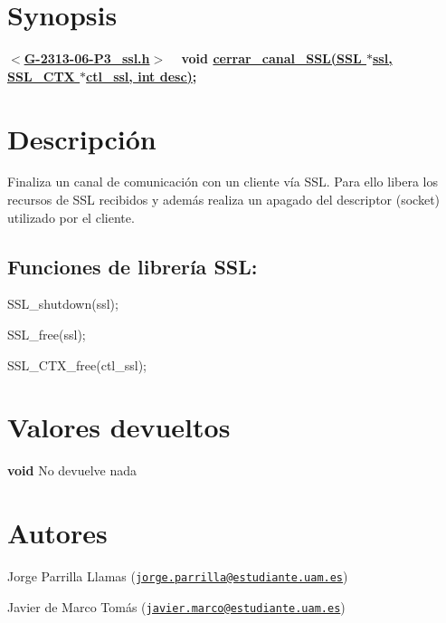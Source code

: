 \hypertarget{cerrar_canal_SSL_synopsis_7}{}\section{Synopsis}\label{cerrar_canal_SSL_synopsis_7}
{ {\bfseries $<$\hyperlink{G-2313-06-P3__ssl_8h}{G-\/2313-\/06-\/\+P3\+\_\+ssl.\+h}$>$} ~\newline
 {\bfseries void \hyperlink{G-2313-06-P3__ssl_8c_a307ee105b4b24b555d8df68603c2deff}{cerrar\+\_\+canal\+\_\+\+S\+S\+L(\+S\+S\+L $\ast$ssl, S\+S\+L\+\_\+\+C\+T\+X $\ast$ctl\+\_\+ssl, int desc)};} } \hypertarget{cerrar_canal_SSL_descripcion_7}{}\section{Descripción}\label{cerrar_canal_SSL_descripcion_7}
Finaliza un canal de comunicación con un cliente vía S\+SL. Para ello libera los recursos de S\+SL recibidos y además realiza un apagado del descriptor (socket) utilizado por el cliente. ~\newline
\subsection*{{\bfseries Funciones de librería S\+SL\+:}}


\begin{DoxyItemize}
\item S\+S\+L\+\_\+shutdown(ssl); 
\item S\+S\+L\+\_\+free(ssl); 
\item S\+S\+L\+\_\+\+C\+T\+X\+\_\+free(ctl\+\_\+ssl); 
\end{DoxyItemize}\hypertarget{conectar_canal_seguro_SSL_return_7}{}\section{Valores devueltos}\label{conectar_canal_seguro_SSL_return_7}

\begin{DoxyItemize}
\item {\bfseries void} No devuelve nada 
\end{DoxyItemize}\hypertarget{conectar_canal_seguro_SSL_authors_7}{}\section{Autores}\label{conectar_canal_seguro_SSL_authors_7}

\begin{DoxyItemize}
\item Jorge Parrilla Llamas (\href{mailto:jorge.parrilla@estudiante.uam.es}{\tt jorge.\+parrilla@estudiante.\+uam.\+es}) 
\item Javier de Marco Tomás (\href{mailto:javier.marco@estudiante.uam.es}{\tt javier.\+marco@estudiante.\+uam.\+es}) 
\end{DoxyItemize}
